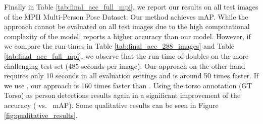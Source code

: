 \documentclass[runningheads]{llncs}
\begin{document}
Finally in Table \ref{tab:final_acc_full_mpi}, we report our results on all test images of the MPII Multi-Person Pose Dataset. Our method achieves  mAP. While the approach \cite{pishchulin2015deepcut} cannot be evaluated on all test images due to the high computational complexity of the model, \cite{insafutdinov2016deepercut} reports a higher accuracy than our model. However, if we compare the run-times in Table \ref{tab:final_acc_288_images} and Table \ref{tab:final_acc_full_mpi}, we observe that the run-time of \cite{insafutdinov2016deepercut} doubles on the more challenging test set (485 seconds per image). Our approach on the other hand requires only 10 seconds in all evaluation settings and is around 50 times faster. If we use , our approach is 160 times faster than \cite{insafutdinov2016deepercut}. Using the torso annotation (GT Torso) as person detections results again in a significant improvement of the accuracy ( vs.~ mAP). Some qualitative results can be seen in Figure \ref{fig:qualitative_results}.
\end{document}
